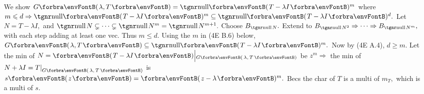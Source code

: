 
We show $G\Par{\lambda, T}=\Null\Par{T-\lambda I}{^m}$ where $m\leqslant d\Rightarrow\Null\Par{T-\lambda I}{^m}\subseteq\Null\Par{T-\lambda I}{^d}.$\vspace{1pt}\parSol{}
Let $N=T-\lambda I,$ and $\null N\subsetneq\cdots\subsetneq\null N^m=\null N^{m+1}.$ Choose $B_{\null N}.$\parSol{}
Extend to $B_{\null N^2}\Rightarrow\cdots\Rightarrow B_{\null N^m},$ with each step adding at least one vec. Thus $m\leqslant d.$\vspace{2pt}\parSol{}
\Or Using the $m$ in (4E B.6) below,  $G\Par{\lambda,T}\subseteq\Null\Par{T-\lambda I}{^m}.$ Now by (4E A.4), $d\geqslant m.$\PfEnd\vspace{4pt}\parSol{}
\Or Let the min of $N=\Par{T-\lambda I}\Big|{_{G\SmallPar{\:\!\lambda,\,T\:\!}}}$ be $z^m\Rightarrow$ the min of $N+\lambda I=T\mmid_{G\SmallPar{\:\!\lambda,\,T\:\!}}$ is $s\Par{z}=\Par{z-\lambda}{^m}.$\parSol{}
Becs the char of $T$  is a multi of $m_T,$ which is a multi of $s.$\PfEnd
\SepLine

